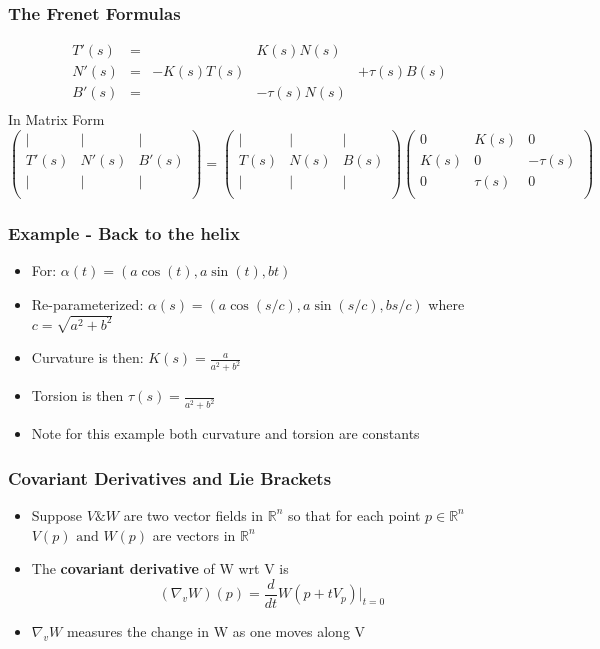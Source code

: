 \documentclass[10pt]{beamer}
\newcommand{\myemph}[1]{{\usebeamercolor[fg]{emphprimary}
    \textbf{#1}}}
\begin{document}
\begin{frame}
  \frametitle{The Frenet Formulas}
  \[
    \begin{array}{rclll}
      T'(s)   &=& & K(s) N(s )& \\
      N'(s)   &=&-K(s) T(s) && + \tau(s) B(s)\\
      B'(s)   & =& & -\tau(s) N(s) \\
    \end{array}
  \]
  In Matrix Form
  \[
    \left(
      \begin{array}{ccc}
        | & | & | \\
        T'(s) & N'(s) & B'(s)\\
        | & | & | \\
      \end{array}
    \right) =
    \left(
      \begin{array}{ccc}
        | & | & | \\
        T(s) & N(s) & B(s)\\
        | & | & | \\
      \end{array}
    \right)
    \left(
      \begin{array}{ccc}
        0 & K(s)& 0 \\
        K(s) & 0 & -\tau(s)\\
        0  & \tau(s) & 0\\
      \end{array}
    \right)
  \]
\end{frame}

\begin{frame}
  \frametitle{Example - Back to the helix}
  \begin{itemize}
  \item For: $\alpha(t) = (a \cos(t), a \sin(t), bt)$
  \item Re-parameterized: $\alpha(s) = (a \cos(s/c), a \sin(s/c), b s/c)$ where $c = \sqrt{a^2 + b^2}$
  \item Curvature is then: $K(s) = \frac{a}{a^2+b^2}$
  \item Torsion is then $\tau(s) = \frac{}{a^2+b^2}$
  \item Note for this example both curvature and torsion are constants
  \end{itemize}
\end{frame}

\begin{frame}
  \frametitle{Covariant Derivatives and Lie Brackets}
  \begin{itemize}
  \item Suppose $V \& W$ are two vector fields in $\mathbb{R}^n$ so
    that for each point $p \in \mathbb{R}^n$ $V(p) \mbox{ and } W(p)$
    are vectors in $\mathbb{R}^n$
  \item The \myemph{covariant derivative} of W wrt V is
    \[
      (\nabla_v W)(p) = \frac{d}{dt} W(p + t V_p)|_{t = 0}
    \]
  \item $\nabla_v W$ measures the change in W as one moves along V
  \end{itemize}
\end{frame}
\end{document}
